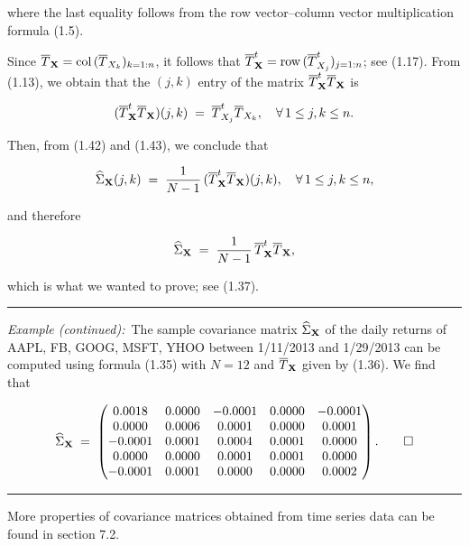 where the last equality follows from the row vector--column vector
multiplication formula (1.5).

Since $\overline{T}_{\mathbf{X}} = \mathrm{col}\,(\overline{T}_{X_k})_{k=1:n}$, it
follows that $\overline{T}_{\mathbf{X}}^t = \mathrm{row}\,(\overline{T}_{X_j}^t)_{j=1:n}$;
see (1.17). From (1.13), we obtain that the $(j,k)$ entry of the matrix
$\overline{T}_{\mathbf{X}}^t\overline{T}_{\mathbf{X}}$ is

\begin{equation}
(\overline{T}_{\mathbf{X}}^t\overline{T}_{\mathbf{X}})(j,k) \;=\;
\overline{T}_{X_j}^t\overline{T}_{X_k}, \quad \forall\, 1\le j,k\le n.
\end{equation}

Then, from (1.42) and (1.43), we conclude that

\[
\widehat{\Sigma}_{\mathbf{X}}(j,k) \;=\; \frac{1}{N-1}\,
(\overline{T}_{\mathbf{X}}^t\overline{T}_{\mathbf{X}})(j,k), \quad \forall\, 1\le j,k\le n,
\]

and therefore

\[
\widehat{\Sigma}_{\mathbf{X}} \;=\; \frac{1}{N-1}\,\overline{T}_{\mathbf{X}}^t\overline{T}_{\mathbf{X}},
\]

which is what we wanted to prove; see (1.37).

\medskip
\noindent\rule{\linewidth}{0.4pt}
\medskip

\noindent\textit{Example (continued):}\ The sample covariance matrix
$\widehat{\Sigma}_{\mathbf{X}}$ of the daily returns of AAPL, FB, GOOG, MSFT, YHOO
between 1/11/2013 and 1/29/2013 can be computed using formula (1.35) with
$N=12$ and $\overline{T}_{\mathbf{X}}$ given by (1.36). We find that

\begin{equation}
\widehat{\Sigma}_{\mathbf{X}} \;=\;
\begin{pmatrix}
0.0018 & 0.0000 & -0.0001 & 0.0000 & -0.0001 \\
0.0000 & 0.0006 & 0.0001 & 0.0000 & 0.0001 \\
-0.0001 & 0.0001 & 0.0004 & 0.0001 & 0.0000 \\
0.0000 & 0.0000 & 0.0001 & 0.0001 & 0.0000 \\
-0.0001 & 0.0001 & 0.0000 & 0.0000 & 0.0002
\end{pmatrix}. \qquad \square
\end{equation}

\medskip
\noindent\rule{\linewidth}{0.4pt}
\medskip

More properties of covariance matrices obtained from time series data can
be found in section 7.2.
